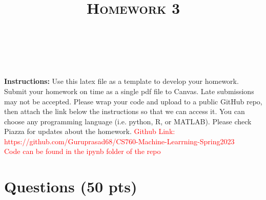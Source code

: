 \documentclass[a4paper]{article}
\title{\textsc{Homework 3}} %
\author{
\red{GURUPRASAD VISWANATHAN RAMESH} \\
\red{9082378762}\\
}
\date{}
\theoremstyle{definition}
\newcommand{\red}[1]{\textcolor{red}{#1}}
\begin{document}
\maketitle 


\textbf{Instructions:} 
Use this latex file as a template to develop your homework. Submit your homework on time as a single pdf file to Canvas. Late submissions may not be accepted. Please wrap your code and upload to a public GitHub repo, then attach the link below the instructions so that we can access it. You can choose any programming language (i.e. python, R, or MATLAB). Please check Piazza for updates about the homework.
\red{Github Link: https://github.com/Guruprasad68/CS760-Machine-Learrning-Spring2023}\\
\red{Code can be found in the ipynb folder of the repo}
\section{Questions (50 pts)}
\end{document}
